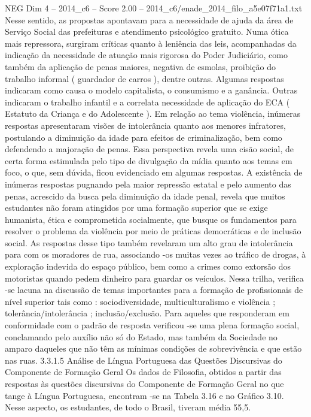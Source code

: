 \begin{textsample}{NEG Dim 4 – 2014\_c6 – Score 2.00 – 2014\_c6/enade\_2014\_filo\_a5e07f71a1.txt}
Nesse sentido, as propostas apontavam para a necessidade de ajuda da área de Serviço Social das prefeituras e atendimento psicológico gratuito.
Numa ótica mais repressora, surgiram críticas quanto à leniência das leis, acompanhadas da indicação da necessidade de atuação mais rigorosa do Poder Judiciário, como também da aplicação de penas maiores, negativa de esmolas, proibição do trabalho informal ( guardador de carros ), dentre outras.
Algumas respostas indicaram como causa o modelo capitalista, o consumismo e a ganância.
Outras indicaram o trabalho infantil e a correlata necessidade de aplicação do ECA ( Estatuto da Criança e do Adolescente ).
Em relação ao tema violência, inúmeras respostas apresentaram visões de intolerância quanto aos menores infratores, postulando a diminuição da idade para efeitos de criminalização, bem como defendendo a majoração de penas.
Essa perspectiva revela uma cisão social, de certa forma estimulada pelo tipo de divulgação da mídia quanto aos temas em foco, o que, sem dúvida, ficou evidenciado em algumas respostas.
A existência de inúmeras respostas pugnando pela maior repressão estatal e pelo aumento das penas, acrescido da busca pela diminuição da idade penal, revela que muitos estudantes não foram atingidos por uma formação superior que se exige humanista, ética e comprometida socialmente, que busque os fundamentos para resolver o problema da violência por meio de práticas democráticas e de inclusão social.
As respostas desse tipo também revelaram um alto grau de intolerância para com os moradores de rua, associando -os muitas vezes ao tráfico de drogas, à exploração indevida do espaço público, bem como a crimes como extorsão dos motoristas quando pedem dinheiro para guardar os veículos.
Nessa trilha, verifica -se lacuna na discussão de temas importantes para a formação de profissionais de nível superior tais como : sociodiversidade, multiculturalismo e violência ; tolerância/intolerância ; inclusão/exclusão.
Para aqueles que responderam em conformidade com o padrão de resposta verificou -se uma plena formação social, conclamando pelo auxílio não só do Estado, mas também da Sociedade no amparo daqueles que não têm as mínimas condições de sobrevivência e que estão nas ruas. 3.3.1.5 Análise de Língua Portuguesa das Questões Discursivas do Componente de Formação Geral Os dados de Filosofia, obtidos a partir das respostas às questões discursivas do Componente de Formação Geral no que tange à Língua Portuguesa, encontram -se na Tabela 3.16 e no Gráfico 3.10.
Nesse aspecto, os estudantes, de todo o Brasil, tiveram média 55,5.

\end{textsample}
